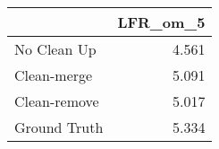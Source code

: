 \begin{tabular}{lr}
\toprule
{} & LFR_om_5 \\
\midrule
No Clean Up  &    4.561 \\
Clean-merge  &    5.091 \\
Clean-remove &    5.017 \\
Ground Truth &    5.334 \\
\bottomrule
\end{tabular}
